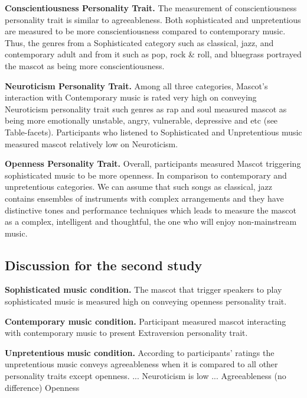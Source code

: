 \par\textbf{Conscientiousness Personality Trait.}
The measurement of conscientiousness personality trait is similar to agreeableness.
Both sophisticated and unpretentious are measured to be more conscientiousness compared to contemporary music.
Thus, the genres from a Sophisticated category such as classical, jazz, and contemporary adult and from it such as
pop, rock \& roll, and bluegrass portrayed the mascot as being more conscientiousness.

\par\textbf{Neuroticism Personality Trait.}
Among all three categories, Mascot's interaction with Contemporary music is rated very high on
conveying Neuroticism personality trait such genres as rap and soul measured mascot as being more
emotionally unstable, angry, vulnerable, depressive and etc (see Table-facets).
Participants who listened to Sophisticated and Unpretentious music measured mascot relatively low on Neuroticism.

\par\textbf{Openness Personality Trait.}
Overall, participants measured Mascot triggering sophisticated music to be more openness.
In comparison to contemporary and unpretentious categories.
We can assume that such songs as classical, jazz contains ensembles of instruments with complex
arrangements and they have distinctive tones and performance techniques which leads to measure the
mascot as a complex, intelligent and thoughtful, the one who will enjoy non-mainstream music.

\subsection{Discussion for the second study}
\label{subsec:discussion-for-the-second-study2}

\par\textbf{Sophisticated music condition.}
The mascot that trigger speakers to play sophisticated music is measured high on conveying openness personality trait.

\par\textbf{Contemporary music condition.}
Participant measured mascot interacting with contemporary music to present Extraversion personality trait.

\par\textbf{Unpretentious music condition.}
According to participants' ratings the unpretentious music conveys agreeableness when it is compared
to all other personality traits except openness.
... Neuroticism is low
... Agreeableness (no difference) Openness

